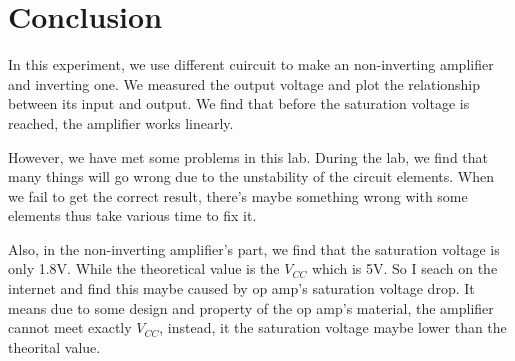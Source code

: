 \documentclass[12pt,a4paper]{article}
\begin{document}
\section{Conclusion}
In this experiment, we use different cuircuit to make an non-inverting amplifier and inverting one. We measured the output voltage and plot the relationship between its input and output. We find that before the saturation voltage is reached, the amplifier works linearly. 

However, we have met some problems in this lab. During the lab, we find that many things will go wrong due to the unstability of the circuit elements. When we fail to get the correct result, there's maybe something wrong with some elements thus take various time to fix it.

Also, in the non-inverting amplifier's part, we find that the saturation voltage is only 1.8V. While the theoretical value is the $V_{CC}$ which is 5V. So I seach on the internet and find this maybe caused by op amp's saturation voltage drop. It means due to some design and property of the op amp's material, the amplifier cannot meet exactly $V_{CC}$, instead, it the saturation voltage maybe lower than the theorital value.
\end{document}
